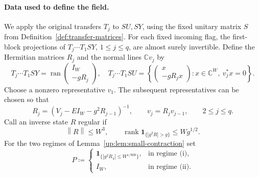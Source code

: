 \documentclass[11pt]{article}
\numberwithin{equation}{section}
\theoremstyle{remark}
\newcommand{\C}{\mathbb C}
\newcommand{\rank}{\operatorname{rank}}
\newcommand{\one}{\mathbf 1}
\newcommand{\norm}[1]{\left\|#1\right\|}
\begin{document}
\paragraph{Data used to define the field.}
We apply the original transfers $T_j$ to $SU,SY$, using the fixed
unitary matrix $S$ from Definition~\ref{def:transfer-matrices}.
For each fixed incoming flag, the first-block projections of
$T_j\cdots T_1SY$, $1\le j\le q$, are almost surely invertible.
Define the Hermitian matrices $R_j$ and the normal lines $\C v_j$ by
\begin{equation}\label{su:eq:graph-input}
 T_j\cdots T_1SY
   =\operatorname{ran}\begin{pmatrix}I_W\\-gR_j\end{pmatrix}, \quad T_j\cdots T_1SU
   =\left\{\begin{pmatrix}x\\-gR_jx\end{pmatrix}:
                     x\in\C^W,\ v_j^*x=0\right\}.
\end{equation}
Choose a nonzero representative $v_1$. The subsequent representatives
can be chosen so that
\begin{equation}\label{su:eq:transported-normal}
 R_j=(V_j-EI_W-g^2R_{j-1})^{-1},\qquad
 v_j=R_jv_{j-1},\qquad 2\le j\le q.
\end{equation}
Call an inverse state $R$ regular if
\begin{equation}
 \norm R\le W^3,\qquad \rank\one_{\{|g^2 R|>g\}}\le Wg^{1/2}.
 \label{us:eq:regular}
\end{equation}
For the two regimes of Lemma~\ref{up:lem:small-contraction} set
\begin{equation}\label{su:eq:source-projection}
 P\coloneqq
 \begin{cases}
 \mathbf1_{\{|g^2R_4|\le W^{\varepsilon/800}\}},&\text{in regime (i)},\\
 I_W,&\text{in regime (ii)}.
 \end{cases}
\end{equation}
\end{document}
